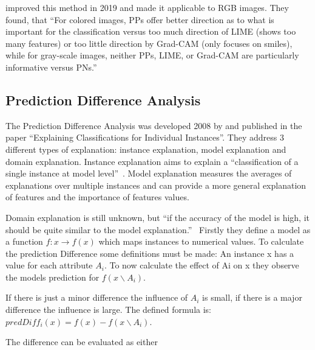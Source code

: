  improved this method in 2019 and made it applicable to RGB images.
They found, that “For colored images, PPs offer better direction as to what is important for the classification versus too much direction of LIME (shows too many features) or too little direction by Grad-CAM (only focuses on smiles), while for gray-scale images, neither PPs, LIME, or Grad-CAM are particularly informative versus PNs.” 

\subsection{Prediction Difference Analysis}
The Prediction Difference Analysis was developed 2008 by  and published in the paper “Explaining Classifications for Individual Instances”. They address 3 different types of explanation: instance explanation, model explanation and domain explanation. Instance explanation aims to explain a “classification of a single instance at model level”~\cite[2]{RobnikSikonja.2008}. Model explanation measures the averages of explanations over multiple instances and can provide a more general explanation of features and the importance of features values.
\par
Domain explanation is still unknown, but “if the accuracy of the model is high, it should be quite similar to the model explanation.”~\cite[2]{RobnikSikonja.2008} Firstly they define a model as a function \(f : x \rightarrow f(x)\) which maps instances to numerical values. To calculate the prediction Difference some definitions must be made: An instance x has a value for each attribute \(A_{i}\). To now calculate the effect of Ai on x they observe the models prediction for  \(f(x \backslash A_{i})\). 
\par
If there is just a minor difference the influence of \(A_{i}\) is small, if there is a major difference the influence is large. The defined formula is: 
\(predDiff_{i} (x) = f(x)− f(x \backslash A_{i})\).
\par
The difference can be evaluated as either
